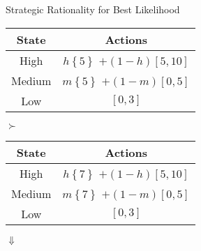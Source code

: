 \documentclass[usenames,dvipsnames,aspectratio=169,11pt, envcountsect, handout]{beamer}
\begin{document}
\begin{frame}{Strategic Rationality for Best Likelihood}
	\begin{table}[H]
		\centering
		\begin{minipage}{0.45\textwidth}
			\centering
			\begin{tabular}{c | c}
				State                          & Actions                                                                                       \\
				\hline
				{\color{bleudefrance} High}    & {\color{bleudefrance}\( h \left\{ 5 \right\} \) } \(+ \left(1-h \right) \left[5,10 \right] \) \\
				{\color{bleudefrance} Medium } & {\color{bleudefrance}\( m \left\{ 5 \right\} \) } \(+ \left(1-m \right) \left[0,5 \right] \)  \\
				Low                            & \( \left[0,3 \right] \)                                                                       \\
			\end{tabular}
		\end{minipage}\hspace{0.25cm} %
		\( \succ \) %
		\hspace{0.25cm}
		\begin{minipage}{0.45\textwidth}
			\centering
			\begin{tabular}{c | c}
				State                          & Actions                                                                                       \\
				\hline
				{\color{bleudefrance} High}    & {\color{bleudefrance}\( h \left\{ 7 \right\} \) } \(+ \left(1-h \right) \left[5,10 \right] \) \\
				{\color{bleudefrance} Medium } & {\color{bleudefrance}\( m \left\{ 7 \right\} \) } \(+ \left(1-m \right) \left[0,5 \right] \)  \\
				Low                            & \( \left[0,3 \right] \)                                                                       \\
			\end{tabular}
		\end{minipage}
	\end{table}
	\vspace{-0.25cm}
	\begin{center}
		\( \Downarrow \)
	\end{center}
	\vspace{-0.25cm}

\end{frame}
\end{document}
